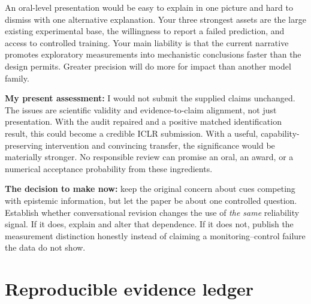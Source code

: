 \documentclass[11pt]{article}
\begin{document}
An oral-level presentation would be easy to explain in one picture and hard to dismiss with one alternative explanation. Your three strongest assets are the large existing experimental base, the willingness to report a failed prediction, and access to controlled training. Your main liability is that the current narrative promotes exploratory measurements into mechanistic conclusions faster than the design permits. Greater precision will do more for impact than another model family.

\textbf{My present assessment:} I would not submit the supplied claims unchanged. The issues are scientific validity and evidence-to-claim alignment, not just presentation. With the audit repaired and a positive matched identification result, this could become a credible ICLR submission. With a useful, capability-preserving intervention and convincing transfer, the significance would be materially stronger. No responsible review can promise an oral, an award, or a numerical acceptance probability from these ingredients.

\begin{takeaway}
\textbf{The decision to make now:} keep the original concern about cues competing with epistemic information, but let the paper be about one controlled question. Establish whether conversational revision changes the use of \emph{the same} reliability signal. If it does, explain and alter that dependence. If it does not, publish the measurement distinction honestly instead of claiming a monitoring--control failure the data do not show.
\end{takeaway}

\clearpage
\appendix

\section{Reproducible evidence ledger}
\end{document}
